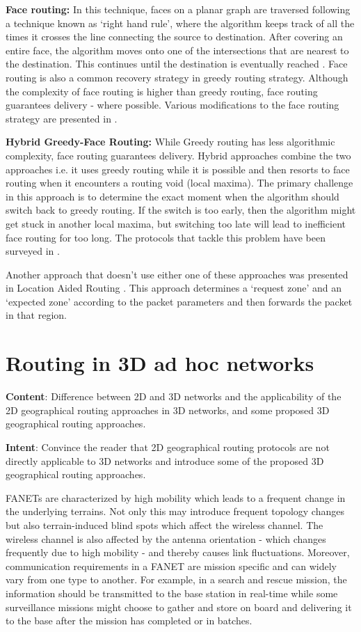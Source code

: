 \textbf{Face routing:} In this technique, faces on a planar graph are traversed following a technique known as `right hand rule', where the algorithm keeps track of all the times it crosses the line connecting the source to destination. After covering an entire face, the algorithm moves onto one of the intersections that are nearest to the destination. This continues until the destination is eventually reached \cite{4448977} \cite{6238283}. Face routing is also a common recovery strategy in greedy routing strategy. Although the complexity of face routing is higher than greedy routing, face routing guarantees delivery - where possible. Various modifications to the face routing strategy are presented in \cite{6238283}.

\textbf{Hybrid Greedy-Face Routing:} While Greedy routing has less algorithmic complexity, face routing guarantees delivery. Hybrid approaches combine the two approaches i.e. it uses greedy routing while it is possible and then resorts to face routing when it encounters a routing void (local maxima). The primary challenge in this approach is to determine the exact moment when the algorithm should switch back to greedy routing. If the switch is too early, then the algorithm might get stuck in another local maxima, but switching too late will lead to inefficient face routing for too long. The protocols that tackle this problem have been surveyed in \cite{6238283}.

Another approach that doesn't use either one of these approaches was presented in Location Aided Routing \cite{Ko:1998:LRM:288235.288252}. This approach determines a `request zone' and an `expected zone' according to the packet parameters and then forwards the packet in that region.

\section{Routing in 3D ad hoc networks}

\textbf{Content}: Difference between 2D and 3D networks and the applicability of the 2D geographical routing approaches in 3D networks, and some proposed 3D geographical routing approaches.
 
\textbf{Intent}: Convince the reader that 2D geographical routing protocols are not directly applicable to 3D networks and introduce some of the proposed 3D geographical routing approaches.

FANETs are characterized by high mobility which leads to a frequent change in the underlying terrains. Not only this may introduce frequent topology changes but also terrain-induced blind spots which affect the wireless channel. The wireless channel is also affected by the antenna orientation - which changes frequently due to high mobility - and thereby causes link fluctuations. Moreover, communication requirements in a FANET are mission specific and can widely vary from one type to another. For example, in a search and rescue mission, the information should be transmitted to the base station in real-time while some surveillance missions might choose to gather and store on board and delivering it to the base after the mission has completed or in batches.

